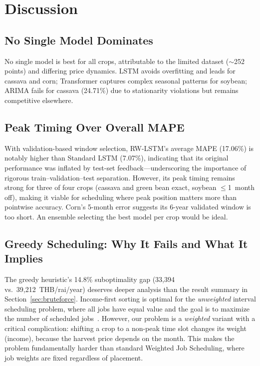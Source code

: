 \documentclass[journal]{IEEEtran}
\begin{document}
\section{Discussion}
\label{sec:discussion}

\subsection{No Single Model Dominates}

No single model is best for all crops, attributable to the limited dataset ($\sim$252 points) and differing price dynamics. LSTM avoids overfitting and leads for cassava and corn; Transformer captures complex seasonal patterns for soybean; ARIMA fails for cassava (24.71\%) due to stationarity violations but remains competitive elsewhere.

\subsection{Peak Timing Over Overall MAPE}

With validation-based window selection, RW-LSTM's average MAPE (17.06\%) is notably higher than Standard LSTM (7.07\%), indicating that its original performance was inflated by test-set feedback---underscoring the importance of rigorous train--validation--test separation. However, its peak timing remains strong for three of four crops (cassava and green bean exact, soybean $\leq$1~month off), making it viable for scheduling where peak position matters more than pointwise accuracy. Corn's 5-month error suggests its 6-year validated window is too short. An ensemble selecting the best model per crop would be ideal.

\subsection{Greedy Scheduling: Why It Fails and What It Implies}

The greedy heuristic's 14.8\% suboptimality gap (33,394 vs.\ 39,212~THB/rai/year) deserves deeper analysis than the result summary in Section~\ref{sec:bruteforce}. Income-first sorting is optimal for the \textit{unweighted} interval scheduling problem, where all jobs have equal value and the goal is to maximize the number of scheduled jobs~\cite{clrs2009}. However, our problem is a \textit{weighted} variant with a critical complication: shifting a crop to a non-peak time slot changes its weight (income), because the harvest price depends on the month. This makes the problem fundamentally harder than standard Weighted Job Scheduling, where job weights are fixed regardless of placement.
\end{document}
